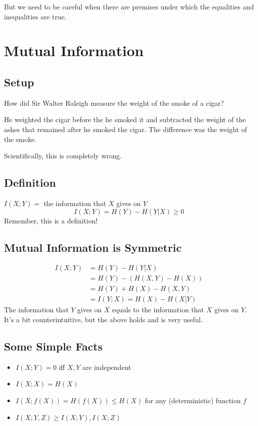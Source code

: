 \documentclass{article}
\begin{document}
But we need to be careful when there are premises under which the equalities and inequalities are true.

\section{Mutual Information}

\subsection{Setup}

How did Sir Walter Raleigh measure the weight of the smoke of a cigar?

He weighted the cigar before the he smoked it and subtracted the weight of the ashes that remained after he smoked the cigar. The difference was the weight of the smoke.

Scientifically, this is completely wrong.

\subsection{Definition}

$I(X;Y)=$ the information that $X$ gives on $Y$
\[
I(X;Y) = H(Y) - H(Y|X) \geq 0
\]
Remember, this is a definition!

\subsection{Mutual Information is Symmetric}

\begin{align*}
    I(X;Y) &= H(Y) - H(Y|X)\\
    &= H(Y) - \left(H(X,Y)-H(X)\right)\\
    &= H(Y) + H(X) - H(X,Y)\\
    &= I(Y;X) = H(X) - H(X|Y)
\end{align*}
The information that $Y$ gives on $X$ equals to the information that $X$ gives on $Y$. It's a bit counterintuitive, but the above holds and is very useful.

\subsection{Some Simple Facts}

\begin{itemize}
    \item $I(X;Y)=0$ iff $X,Y$ are independent
    \item $I(X;X)=H(X)$
    \item $I(X;f(X))= H(f(X)) \leq H(X)$ for any (deterministic) function $f$
    \item $I(X;Y,Z)\geq I(X;Y),I(X;Z)$
\end{itemize}
\end{document}
